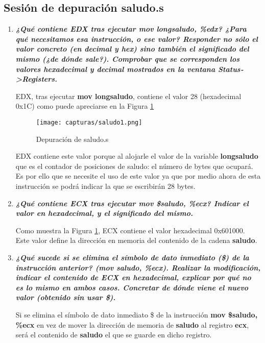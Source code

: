 \subsection{Sesión de depuración saludo.s}
\begin{enumerate}
	\item \textbf{\textit{¿Qué contiene EDX tras ejecutar mov longsaludo, \%edx?
		 ¿Para qué necesitamos esa instrucción, o ese valor? Responder no sólo el valor concreto (en decimal y hex) sino también el significado del mismo (¿de dónde sale?). Comprobar que se corresponden los valores hexadecimal y decimal mostrados en la ventana Status‐>Registers.}}
	 
	 EDX, tras ejecutar \textbf{mov longsaludo}, contiene el valor 28 (hexadecimal 0x1C) como puede apreciarse en la Figura \ref{fig:figura4}
	 \begin{figure}[H] %
	 	\centering
	 	\texttt{[image: capturas/saludo1.png]}  
	 	\caption{Depuración de saludo.s} 
	 	\label{fig:figura4}
	 \end{figure}
	 EDX contiene este valor porque al alojarle el valor de la variable \textbf{longsaludo} que es el contador de posiciones de saludo: el número de bytes que ocupará. Es por ello que se necesite el uso de este valor ya que por medio ahora de esta instrucción se podrá indicar la que se escribirán 28 bytes.
	 
	\item \textbf{\textit{¿Qué contiene ECX tras ejecutar mov \$saludo, \%ecx? Indicar el valor en hexadecimal, y el significado del mismo.}}
	
	Como muestra la Figura \ref{fig:figura4}, ECX contiene el valor hexadecimal 0x601000. Este valor define la dirección en memoria del contenido de la cadena \textbf{saludo}.
	
	\item \textbf{\textit{¿Qué sucede si se elimina el símbolo de dato inmediato (\$) de la instrucción anterior? (mov saludo, \%ecx). Realizar la modificación, indicar el contenido de ECX en hexadecimal, explicar por qué no es lo mismo en ambos casos. Concretar de dónde viene el nuevo valor (obtenido sin usar \$).}}
	
	Si se elimina el símbolo de dato inmediato \$ de la instrucción  \textbf{mov \$saludo, \%ecx} en vez de mover la dirección de memoria de \textbf{saludo} al registro \textbf{ecx}, será el contenido de \textbf{saludo} el que se guarde en dicho registro. 
	

\end{enumerate}

